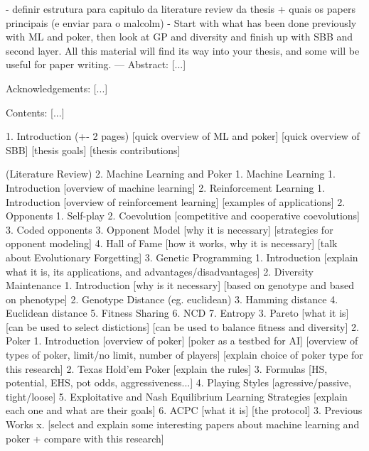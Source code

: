 - definir estrutura para capitulo da literature review da thesis + quais os papers principais (e enviar para o malcolm)
    - Start with what has been done previously with ML and poker, then look at GP and diversity and finish up with SBB and second layer. All this material will find its way into your thesis, and some will be useful for paper writing.
---
Abstract:
[...]

Acknowledgements:
[...]

Contents:
[...]

1. Introduction (+- 2 pages)
    [quick overview of ML and poker]
    [quick overview of SBB]
    [thesis goals]
    [thesis contributions]

(Literature Review)
2. Machine Learning and Poker
    1. Machine Learning
        1. Introduction
            [overview of machine learning]
        2. Reinforcement Learning
            1. Introduction
                [overview of reinforcement learning]
                [examples of applications]
            2. Opponents
                1. Self-play
                2. Coevolution
                    [competitive and cooperative coevolutions]
                3. Coded opponents
            3. Opponent Model
                [why it is necessary]
                [strategies for opponent modeling]
            4. Hall of Fame
                [how it works, why it is necessary]
                [talk about Evolutionary Forgetting]
        3. Genetic Programming
            1. Introduction
                [explain what it is, its applications, and advantages/disadvantages]
            2. Diversity Maintenance
                1. Introduction
                    [why is it necessary]
                    [based on genotype and based on phenotype]
                2. Genotype Distance (eg. euclidean) 
                3. Hamming distance
                4. Euclidean distance
                5. Fitness Sharing
                6. NCD
                7. Entropy
            3. Pareto
                [what it is]
                [can be used to select distictions]
                [can be used to balance fitness and diversity]
    2. Poker
        1. Introduction
            [overview of poker]
            [poker as a testbed for AI]
            [overview of types of poker, limit/no limit, number of players]
            [explain choice of poker type for this research]
        2. Texas Hold’em Poker
            [explain the rules]
        3. Formulas
            [HS, potential, EHS, pot odds, aggressiveness...]
        4. Playing Styles
            [agressive/passive, tight/loose]
        5. Exploitative and Nash Equilibrium Learning Strategies
            [explain each one and what are their goals]
        6. ACPC
            [what it is]
            [the protocol]
    3. Previous Works
        x. [select and explain some interesting papers about machine learning and poker + compare with this research]

